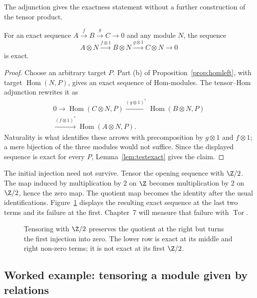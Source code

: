 The adjunction gives the exactness statement without a further construction of the tensor product.

\begin{corollary}\label{cor:rightexact}
For an exact sequence $A\xrightarrow f B\xrightarrow g C\to0$ and any module $N$, the sequence
\[
A\otimes N\xrightarrow{f\otimes1}B\otimes N
\xrightarrow{g\otimes1}C\otimes N\to0
\]
is exact.
\end{corollary}

\begin{proof}
Choose an arbitrary target $P$. Part (b) of Proposition~\ref{prop:homleft}, with target $\operatorname{Hom}(N,P)$, gives an exact sequence of Hom-modules. The tensor--Hom adjunction rewrites it as
\[
\begin{gathered}
0\to\operatorname{Hom}(C\otimes N,P)
\xrightarrow{(g\otimes1)^*}\operatorname{Hom}(B\otimes N,P)\\
\xrightarrow{(f\otimes1)^*}\operatorname{Hom}(A\otimes N,P).
\end{gathered}
\]
Naturality is what identifies these arrows with precomposition by $g\otimes1$ and $f\otimes1$; a mere bijection of the three modules would not suffice. Since the displayed sequence is exact for every $P$, Lemma~\ref{lem:testexact} gives the claim.
\end{proof}

The initial injection need not survive. Tensor the opening sequence with $\Z/2$. The map induced by multiplication by $2$ on $\Z$ becomes multiplication by $2$ on $\Z/2$, hence the zero map. The quotient map becomes the identity after the usual identifications. Figure~\ref{fig:v10new-ch03-collapse} displays the resulting exact sequence at the last two terms and its failure at the first. Chapter~7 will measure that failure with $\operatorname{Tor}$.

\begin{figure}[ht]
\centering
{}
\caption{Tensoring with $\Z/2$ preserves the quotient at the right but turns the first injection into zero. The lower row is exact at its middle and right non-zero terms; it is not exact at its first $\Z/2$.}
\label{fig:v10new-ch03-collapse}
\end{figure}


\subsection*{Worked example: tensoring a module given by relations}

